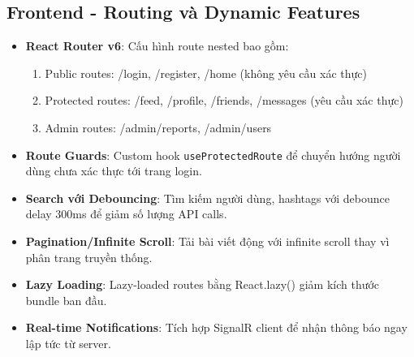 \documentclass[a4paper]{article}
\begin{document}
    \subsection{Frontend - Routing và Dynamic Features}
    \begin{itemize}
        \item \textbf{React Router v6}: Cấu hình route nested bao gồm:
        \begin{enumerate}
            \item Public routes: /login, /register, /home (không yêu cầu xác thực)
            \item Protected routes: /feed, /profile, /friends, /messages (yêu cầu xác thực)
            \item Admin routes: /admin/reports, /admin/users
        \end{enumerate}
        \item \textbf{Route Guards}: Custom hook \texttt{useProtectedRoute} để chuyển hướng người dùng chưa xác thực tới trang login.
        \item \textbf{Search với Debouncing}: Tìm kiếm người dùng, hashtags với debounce delay 300ms để giảm số lượng API calls.
        \item \textbf{Pagination/Infinite Scroll}: Tải bài viết động với infinite scroll thay vì phân trang truyền thống.
        \item \textbf{Lazy Loading}: Lazy-loaded routes bằng React.lazy() giảm kích thước bundle ban đầu.
        \item \textbf{Real-time Notifications}: Tích hợp SignalR client để nhận thông báo ngay lập tức từ server.
    \end{itemize}

    
\end{document}
